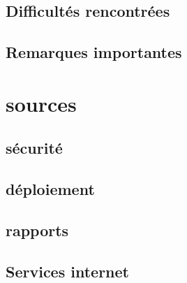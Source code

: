 \documentclass{article}
\begin{document}
    \subsection{Difficultés rencontrées} 
    
    \subsection{Remarques importantes}

\section{sources}

    \subsection{sécurité}
   
    \subsection{déploiement}
   
    \subsection{rapports}
       
    \subsection{Services internet}
   
\end{document}
